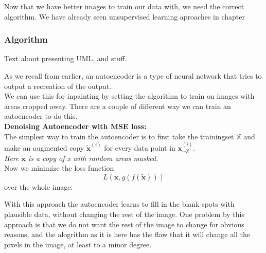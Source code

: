     Now that we have better images to train our data with, we need the correct algorithm.
    We have already seen unsupervised learning aproaches in chapter %
    \newpage
    \subsubsection{Algorithm}
      Text about presenting UML, and stuff.
  
	\newpage
	As we recall from earlier, an autoencoder is a type of neural network that tries to output a recreation of the output.\\%
	We can use this for inpainting by setting the algorithm to train on images with areas cropped away.
	There are a couple of different way we can train an autoencoder to do this.\\
	
	
	
	\vspace{10px}
	\textbf{Denoising Autoencoder with MSE loss:}\label{par:Denoising_Autoencoder_with_MSE_loss}\\
	The simplest way to train the autoencoder is to first take the trainingset $\mathds{X}$ and make an augmented copy $\widetilde{\textbf{x}}^{(i)}$ for 
	every data point in $\textbf{x}_{\sim \mathds{X}}^{(i)}$. \\
	\textit{Here $\widetilde{\textbf{x}}$ is a copy of x with random areas masked.}\\
	
	Now we minimize the loss function\\	
	  \begin{equation}
	    L(\textbf{x},g(f(\widetilde{\textbf{x}})))
	  \end{equation}
	over the whole image.\\
	\vspace{20px}
	
	With this approach the autoencoder learns to fill in the blank spots with plausible data, without changing the rest of the image. 
	One problem by this approach is that we do not want the rest of the image to change for obvious reasons, and the alogrithm as it is here has the flaw that it will change all the pixels in the image, at 
	least to a minor degree. \\
	
